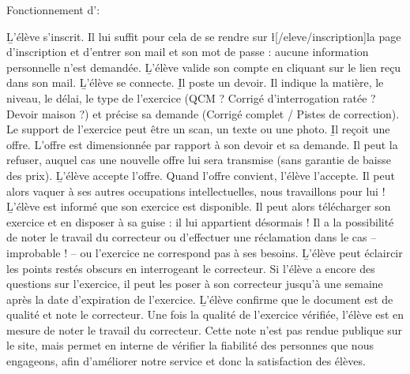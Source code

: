 ﻿Fonctionnement d'\eDevoir :
\begin{enumerate}
	\li \b{L'élève s'inscrit.} Il lui suffit pour cela de se rendre sur \l[/eleve/inscription]{la page d'inscription} et d'entrer son mail et son mot de passe : aucune information personnelle n'est demandée.
	\li \b{L'élève valide son compte en cliquant sur le lien reçu dans son mail.}
	\li \b{L'élève se connecte.}
	\li \b{Il poste un devoir.} Il indique la matière, le niveau, le délai, le type de l'exercice (QCM ? Corrigé d'interrogation ratée ? Devoir maison ?) et précise sa demande (Corrigé complet / Pistes de correction). Le support de l'exercice peut être un scan, un texte ou une photo.
	\li \b{Il reçoit une offre.} L'offre est dimensionnée par rapport à son devoir et sa demande. Il peut la refuser, auquel cas une nouvelle offre lui sera transmise (sans garantie de baisse des prix).
	\li \b{L'élève accepte l'offre.} Quand l'offre convient, l'élève l'accepte. Il peut alors vaquer à ses autres occupations intellectuelles, nous travaillons pour lui !
	\li \b{L'élève est informé que son exercice est disponible.} Il peut alors télécharger son exercice et en disposer à sa guise : il lui appartient désormais ! Il a la possibilité de noter le travail du correcteur ou d'effectuer une réclamation dans le cas -- improbable ! -- ou l'exercice ne correspond pas à ses besoins.
	\li \b{L'élève peut éclaircir les points restés obscurs en interrogeant le correcteur.} Si l'élève a encore des questions sur l'exercice, il peut les poser à son correcteur jusqu'à une semaine après la date d'expiration de l'exercice.
	\li \b{L'élève confirme que le document est de qualité et note le correcteur.} Une fois la qualité de l'exercice vérifiée, l'élève est en mesure de noter le travail du correcteur. Cette note n'est pas rendue publique sur le site, mais permet en interne de vérifier la fiabilité des personnes que nous engageons, afin d'améliorer notre service et donc la satisfaction des élèves.
\end{enumerate}
